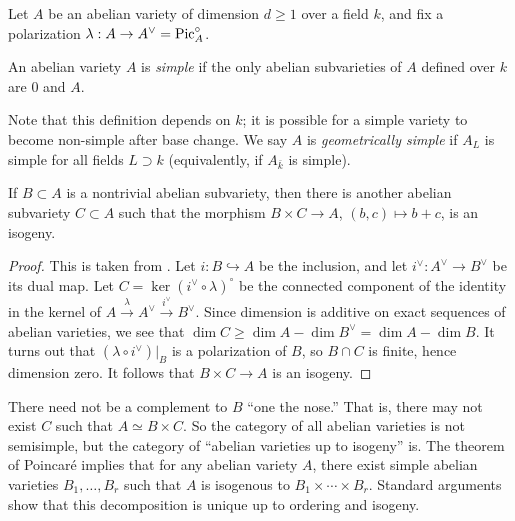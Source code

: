 Let $A$ be an abelian variety of dimension $d\geqslant 1$ over a field $k$, 
and fix a polarization $\lambda:A\to A^\vee=\operatorname{Pic}_A^\circ$. 

\begin{definition}
An abelian variety $A$ is \emph{simple} if the only abelian subvarieties of $A$ 
defined over $k$ are $0$ and $A$.
\end{definition}

Note that this definition depends on $k$; it is possible for a simple variety 
to become non-simple after base change. We say $A$ is \emph{geometrically 
simple} if $A_L$ is simple for all fields $L\supset k$ (equivalently, if 
$A_{\bar k}$ is simple). 

\begin{theorem}[Poincar\'e]\label{thm:poincare-reducibility}
If $B\subset A$ is a nontrivial abelian subvariety, then there is another 
abelian subvariety $C\subset A$ such that the morphism $B\times C\to A$, 
$(b,c)\mapsto b+c$, is an isogeny. 
\end{theorem}
\begin{proof}
This is taken from \cite[I.10.1]{mi-av}. Let $i:B\hookrightarrow A$ be the 
inclusion, and let $i^\vee:A^\vee \to B^\vee$ be its dual map. Let 
$C=\ker(i^\vee\circ\lambda)^\circ$ be the connected component of the identity 
in the kernel of $A\xrightarrow\lambda A^\vee \xrightarrow{i^\vee} B^\vee$. 
Since dimension is additive on exact sequences of abelian varieties, we see 
that $\dim C\geqslant \dim A-\dim B^\vee=\dim A-\dim B$. It turns out that 
$(\lambda\circ i^\vee)|_B$ is a polarization of $B$, so $B\cap C$ is finite, 
hence dimension zero. It follows that $B\times C\to A$ is an isogeny. 
\end{proof}

There need not be a complement to $B$ ``one the nose.'' That is, there may not 
exist $C$ such that $A\simeq B\times C$. So the category of all abelian 
varieties is not semisimple, but the category of ``abelian varieties up to 
isogeny'' is. The theorem of Poincar\'e implies that for any abelian variety 
$A$, there exist simple abelian varieties $B_1,\dots,B_r$ such that $A$ is 
isogenous to $B_1\times\cdots \times B_r$. Standard arguments show that this 
decomposition is unique up to ordering and isogeny. 

